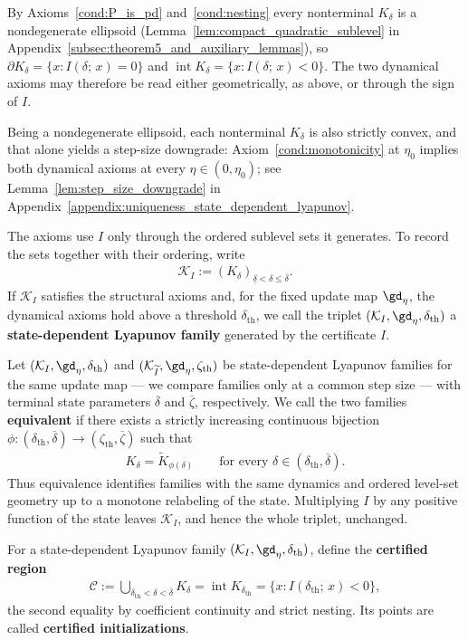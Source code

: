 \documentclass{article}
\begin{document}
By Axioms~\ref{cond:P_is_pd} and~\ref{cond:nesting} every nonterminal
$K_\delta$ is a nondegenerate ellipsoid
(Lemma~\ref{lem:compact_quadratic_sublevel} in
Appendix~\ref{subsec:theorem5_and_auxiliary_lemmas}), so
$\partial K_\delta=\{x:I(\delta;\,x)=0\}$ and
$\operatorname{int}K_\delta=\{x:I(\delta;\,x)<0\}$. The two dynamical axioms may
therefore be read either geometrically, as above, or through the sign of $I$.

Being a nondegenerate ellipsoid, each nonterminal $K_\delta$ is also strictly
convex, and that alone yields a step-size downgrade:
Axiom~\ref{cond:monotonicity} at $\eta_0$ implies both dynamical axioms at
every $\eta\in(0,\eta_0)$; see Lemma~\ref{lem:step_size_downgrade} in
Appendix~\ref{appendix:uniqueness_state_dependent_lyapunov}.

The axioms use $I$ only through the ordered sublevel sets it generates. To record the sets together with their ordering, write
\begin{align}
    \mathcal K_I
    :=(K_\delta)_{\underline\delta<\delta\le\overline\delta}.
\end{align}
If $\mathcal K_I$ satisfies the structural axioms and, for the fixed update map
$\gd_\eta$, the dynamical axioms hold above a threshold
$\delta_{\mathrm{th}}$, we call the triplet
$(\mathcal K_I,\gd_\eta,\delta_{\mathrm{th}})$ a
\textbf{state-dependent Lyapunov family} generated by the certificate
$I$.

Let $(\mathcal K_I,\gd_\eta,\delta_{\mathrm{th}})$ and
$(\mathcal K_{\widetilde I},\gd_\eta,\zeta_{\mathrm{th}})$ be
state-dependent Lyapunov families for the same update map --- we compare
families only at a common step size --- with terminal state parameters
$\overline\delta$ and $\overline\zeta$, respectively. We call the
two families \textbf{equivalent} if there exists a strictly increasing
continuous bijection
$\phi:(\delta_{\mathrm{th}},\overline\delta)
\to(\zeta_{\mathrm{th}},\overline\zeta)$ such that
\begin{align}
    K_\delta=\widetilde K_{\phi(\delta)}
    \qquad\text{for every }
    \delta\in(\delta_{\mathrm{th}},\overline\delta).
    \label{eq:family_equivalence}
\end{align}
Thus equivalence identifies families with the same dynamics and ordered
level-set geometry up to a monotone relabeling of the state. Multiplying $I$ by
any positive function of the state leaves $\mathcal K_I$, and hence the whole
triplet, unchanged.

For a state-dependent Lyapunov family
$(\mathcal K_I,\gd_\eta,\delta_{\mathrm{th}})$, define the
\textbf{certified region}
\begin{align}
    \mathcal C
    :=\bigcup_{\delta_{\mathrm{th}}<\delta<\overline\delta}K_\delta
    =\operatorname{int}K_{\delta_{\mathrm{th}}}
    =\{x:I(\delta_{\mathrm{th}};\,x)<0\},
    \label{eq:certified_region_threshold}
\end{align}
the second equality by coefficient continuity and strict nesting. Its points
are called \textbf{certified initializations}.
\end{document}
